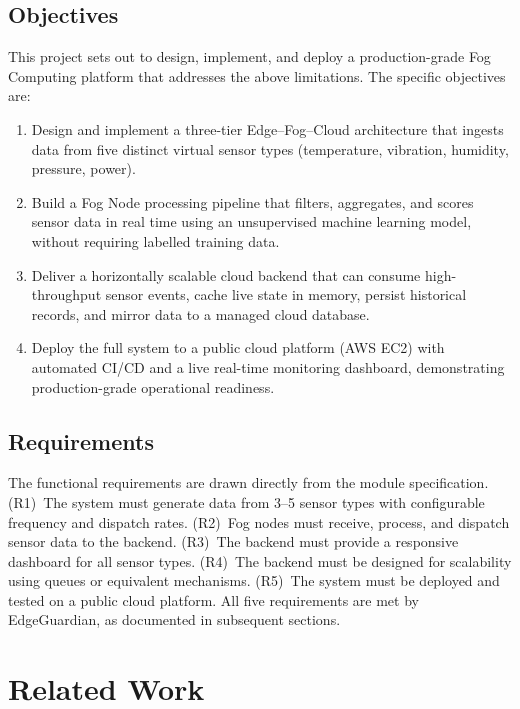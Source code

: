 \documentclass[conference]{IEEEtran}
\begin{document}
\subsection{Objectives}

This project sets out to design, implement, and deploy a production-grade
Fog Computing platform that addresses the above limitations. The specific
objectives are:

\begin{enumerate}[label=\textbf{O\arabic*.}]
  \item Design and implement a three-tier Edge--Fog--Cloud architecture
        that ingests data from five distinct virtual sensor types (temperature,
        vibration, humidity, pressure, power).
  \item Build a Fog Node processing pipeline that filters, aggregates, and
        scores sensor data in real time using an unsupervised machine learning
        model, without requiring labelled training data.
  \item Deliver a horizontally scalable cloud backend that can consume
        high-throughput sensor events, cache live state in memory, persist
        historical records, and mirror data to a managed cloud database.
  \item Deploy the full system to a public cloud platform (AWS EC2) with
        automated CI/CD and a live real-time monitoring dashboard,
        demonstrating production-grade operational readiness.
\end{enumerate}

\subsection{Requirements}

The functional requirements are drawn directly from the module specification.
(R1)~The system must generate data from 3--5 sensor types with configurable
frequency and dispatch rates. (R2)~Fog nodes must receive, process, and
dispatch sensor data to the backend. (R3)~The backend must provide a
responsive dashboard for all sensor types. (R4)~The backend must be designed
for scalability using queues or equivalent mechanisms. (R5)~The system must
be deployed and tested on a public cloud platform. All five requirements are
met by EdgeGuardian, as documented in subsequent sections.

\section{Related Work}
\label{sec:related}
\end{document}

